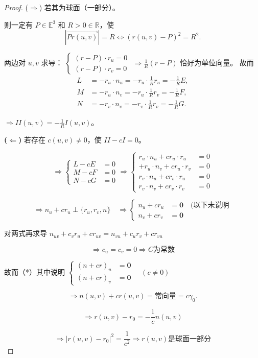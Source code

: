 \documentclass[lang=cn,10pt,thmcnt=section]{elegantbook}
\renewcommand{\vec}[1]{\mathbf{#1}}
\begin{document}
\begin{proof}
    ($\Rightarrow$) 若其为球面（一部分）。

则一定有 $P \in \mathbb{E}^3$ 和 $R > 0 \in \mathbb{R}$，使
$$
|\overrightarrow{Pr(u,v)}| = R \Leftrightarrow (r(u,v) - P)^2 = R^2.
$$

两边对 $u, v$ 求导：
$\begin{cases}
(r - P) \cdot r_u = 0 \\
(r - P) \cdot r_v = 0
\end{cases}$
$\Rightarrow \frac{1}{R}(r - P)$ 恰好为单位向量。
故而
\begin{align*}
L &= -r_u \cdot n_u = -r_u \cdot \frac{1}{R} r_u = -\frac{1}{R} E, \\
M &= -r_u \cdot n_v = -r_u \cdot \frac{1}{R} r_v = -\frac{1}{R} F, \\
N &= -r_v \cdot n_v = -r_v \cdot \frac{1}{R} r_v = -\frac{1}{R} G.
\end{align*}

$\Rightarrow II(u,v) = -\frac{1}{R} I(u,v)$。

\textbf{($\Leftarrow$)} 若存在 $c(u,v) \neq 0$，使 $II - cI = 0$。

$$
\Rightarrow \left\{
\begin{aligned}
L - cE &= 0 \\
M - cF &= 0 \\
N - cG &= 0
\end{aligned}
\right.
\Rightarrow \left\{
\begin{aligned}
r_u \cdot n_u + cr_u \cdot r_u &= 0 \\
+ r_u \cdot n_v + cr_u \cdot r_v &= 0 \\
r_v \cdot n_u + cr_v \cdot r_u &= 0 \\
r_v \cdot n_v + cr_v \cdot r_v &= 0
\end{aligned}
\right.
$$

$$
\Rightarrow n_u + cr_u \perp \{r_u, r_v, n\} \quad \Rightarrow \left\{
\begin{aligned}
n_u + cr_u &= \vec{0} \quad (\text{以下未说明} \\
n_v + cr_v &= \vec{0}
\end{aligned}
\right.
$$

对两式再求导 $n_{uv} + c_v r_u + c r_{uv} = n_{vu} + c_u r_v + c r_{vu}$

$$
\Rightarrow c_u = c_v = 0 \Rightarrow C \text{为常数}
$$

故而（*）其中说明 $\left\{
\begin{aligned}
(n + cr)_u &= \vec{0} \\
(n + cr)_v &= \vec{0}
\end{aligned}
\right. \quad (c \neq 0)$

$$
\Rightarrow n(u,v) + c r(u,v) = \text{常向量} = c \gamma_0.
$$

$$
\Rightarrow r(u,v) - r_0 = -\frac{1}{c} n(u,v)
$$

$$
\Rightarrow |r(u,v) - r_0|^2 = \frac{1}{c^2} \Rightarrow r(u,v) \text{是球面一部分}
$$

\end{proof}
\end{document}
